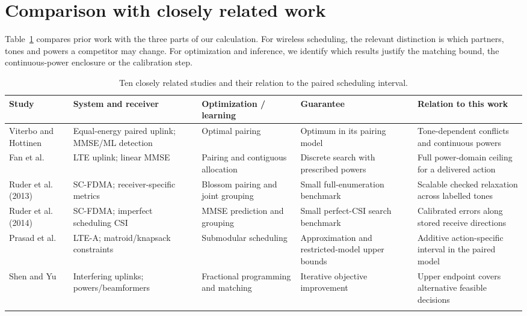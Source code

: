 \section{Comparison with closely related work}
\label{suppnote:literature}
Table~\ref{supp:comparison} compares prior work with the three parts of our calculation. For wireless scheduling, the relevant distinction is which partners, tones and powers a competitor may change. For optimization and inference, we identify which results justify the matching bound, the continuous-power enclosure or the calibration step.
\begin{table}[htbp]\centering\small
\setlength{\tabcolsep}{3pt}
\caption{Ten closely related studies and their relation to the paired scheduling interval.}\label{supp:comparison}
\begin{tabular}{@{}>{\raggedright\arraybackslash}p{.14\linewidth}>{\raggedright\arraybackslash}p{.20\linewidth}>{\raggedright\arraybackslash}p{.21\linewidth}>{\raggedright\arraybackslash}p{.19\linewidth}>{\raggedright\arraybackslash}p{.20\linewidth}@{}}\toprule
Study & System and receiver & Optimization / learning & Guarantee & Relation to this work\\\midrule
Viterbo and Hottinen~\cite{viterbo} & Equal-energy paired uplink; MMSE/ML detection & Optimal pairing & Optimum in its pairing model & Tone-dependent conflicts and continuous powers\\\addlinespace[3pt]
Fan et al.~\cite{fan} & LTE uplink; linear MMSE & Pairing and contiguous allocation & Discrete search with prescribed powers & Full power-domain ceiling for a delivered action\\\addlinespace[3pt]
Ruder et al. (2013)~\cite{ruder2013} & SC-FDMA; receiver-specific metrics & Blossom pairing and joint grouping & Small full-enumeration benchmark & Scalable checked relaxation across labelled tones\\\addlinespace[3pt]
Ruder et al. (2014)~\cite{ruder2014} & SC-FDMA; imperfect scheduling CSI & MMSE prediction and grouping & Small perfect-CSI search benchmark & Calibrated errors along stored receive directions\\\addlinespace[3pt]
Prasad et al.~\cite{prasad} & LTE-A; matroid/knapsack constraints & Submodular scheduling & Approximation and restricted-model upper bounds & Additive action-specific interval in the paired model\\\addlinespace[3pt]
Shen and Yu~\cite{shenfptwo} & Interfering uplinks; powers/beamformers & Fractional programming and matching & Iterative objective improvement & Upper endpoint covers alternative feasible decisions\\\addlinespace[3pt]

\end{tabular}
\end{table}
